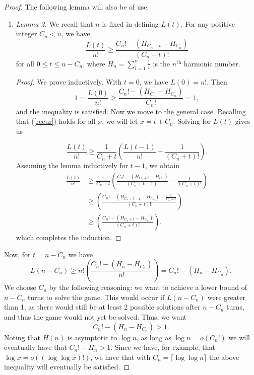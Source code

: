 \documentclass[12pt, a4paper]{article}
\newcommand{\nth}{^{\text{th}}}       %
\begin{document}
\begin{proof}
		The following lemma will also be of use.
		\begin{enumerate}[label=]
			\item\textit{Lemma 2.} We recall that $n$ is fixed in defining $L(t)$. For any positive integer $C_n < n$, we have
			\begin{equation*}
				\frac{L(t)}{n!}\ge \frac{C_{n}! - (H_{C_{n}+t} - H_{C_{n}})}{(C_n+t)!}
			\end{equation*}
			for all $0\le t\le n-C_{n}$, where $H_n=\sum_{i = 1}^n\frac{1}{i}$ is the $n\nth$ harmonic number.
		\begin{proof} We prove inductively. With $t=0$, we have $L(0) = n!$. Then
			\begin{equation*}
			1 =\frac{L(0)}{n!}\ge \frac{C_{n}! - (H_{C_{n}}-H_{C_{n}})}{C_{n}!} = 1,
			\end{equation*}
			and the inequality is satisfied. Now we move to the general case.
			Recalling that (\ref{recur}) holds for all $x$, we will
		let $x=t+C_{n}$. Solving for $L(t)$ gives us
		
			\begin{equation*}
			\frac{L(t)}{n!}
			 \ge \frac{1}{C_{n}+t}\left(\frac{L(t-1)}{n!}
			-\frac{1}{(C_{n}+t)!}\right).
			\end{equation*}
		Assuming the lemma inductively for $t-1$, we obtain
			\begin{align*}
			\frac{L(t)}{n!}
			& \ge \frac{1}{C_{n}+t}\left(\frac{C_{n}!-(H_{C_{n}+t} - H_{C_{n}})}
			{(C_{n}+t-1)!} - \frac{1}{(C_{n}+t)!}\right)\\
			& \ge \left(\frac{C_{n}! - (H_{C_{n}+t-1} - H_{C_{n}}) - \frac{1}{C_{n}+t}}
			{(C_{n}+t)!}\right)\\
			& \ge \left(\frac{C_{n}! - (H_{C_{n}+t} - H_{C_{n}})}{(C_{n}+t)!}\right),
			\end{align*}
			which completes the induction.
		\end{proof}

	\end{enumerate}
	Now, for $t = n-C_n$ we have
	\begin{equation*}
	L(n-C_{n})  \ge n!\left(\frac{C_{n}! - (H_n - H_{C_{n}})}{n!}\right)
	 = C_{n}! - (H_n-H_{C_{n}}).
	\end{equation*}
	We choose $C_{n}$ by the following reasoning: we want to achieve a lower bound of $n-C_{n}$ turns to solve the game. This would occur if $L(n-C_n)$ were greater than 1, as there would still be at least 2 possible solutions after $n-C_n$ turns, and thus the game would not yet be solved. Thus, we want
		\begin{equation*}
			C_{n}! - (H_n - H_{C_{n}}) > 1.
		\end{equation*}
		Noting that $H(n)$ is asymptotic to $\log n$, as long as $\log n = o(C_n!)$ we will eventually have that $C_n!-H_n > 1$. Since we have, for example, that $\log x = o((\log \log x)!)$, we have that with $C_n = \lceil \log \log n \rceil$ the above inequality will eventually be satisfied.
		

\end{proof}
\end{document}

